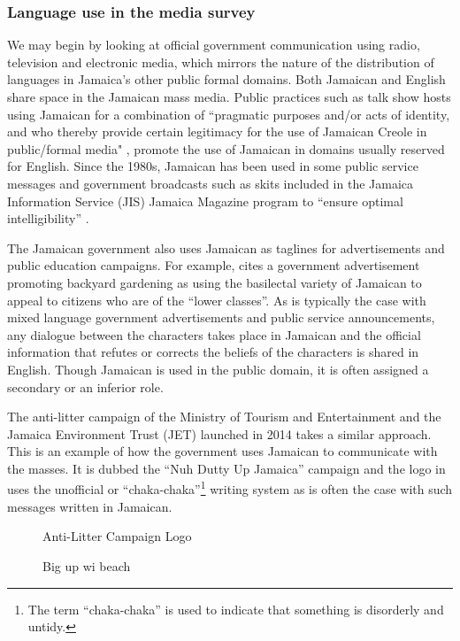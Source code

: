 \documentclass[output=paper,colorlinks,citecolor=brown]{langscibook}
\begin{document}
\subsubsection{Language use in the media survey}

We may begin by looking at official government communication using radio, television and electronic media, which mirrors the nature of the distribution of languages in Jamaica’s other public formal domains. Both Jamaican and English share space in the Jamaican mass media. Public practices such as talk show hosts using Jamaican for a combination of “pragmatic purposes and/or acts of identity, and who thereby provide certain legitimacy for the use of Jamaican Creole in public/formal media" \citep[202]{ShieldsBrodber2022}, promote the use of Jamaican in domains usually reserved for English. Since the 1980s, Jamaican has been used in some public service messages and government broadcasts such as skits included in the Jamaica Information Service (JIS) Jamaica Magazine program to “ensure optimal intelligibility” \citep[9]{Akers1981}.

The Jamaican government also uses Jamaican as taglines for advertisements and public education campaigns. For example, \citet[35]{Westphal2010} cites a government advertisement promoting backyard gardening as using the basilectal variety of Jamaican to appeal to citizens who are of the “lower classes”. As is typically the case with mixed language government advertisements and public service announcements, any dialogue between the characters takes place in Jamaican and the official information that refutes or corrects the beliefs of the characters is shared in English. Though Jamaican is used in the public domain, it is often assigned a secondary or an inferior role. 

The anti-litter campaign of the Ministry of Tourism and Entertainment and the Jamaica Environment Trust (JET) launched in 2014 takes a similar approach. This is an example of how the government uses Jamaican to communicate with the masses. It is dubbed the “Nuh Dutty Up Jamaica” campaign and the logo in  uses the unofficial or “chaka-chaka”\footnote{The term “chaka-chaka” is used to indicate that something is disorderly and untidy.} writing system as is often the case with such messages written in Jamaican.  

\begin{figure}
\begin{floatrow}
  \captionsetup{margin=.05\linewidth}%
          {\caption{Anti-Litter Campaign Logo \citep{JamaicaEnvironmentTrust2016}\label{fig:Anti-LitterCampaignLogo}}}%
          {\caption{Big up wi beach \citep{JamaicaEnvironmentTrust2016}\label{fig:Big_up_wi_beach}}}%
\end{floatrow} 
\end{figure}
\end{document}
